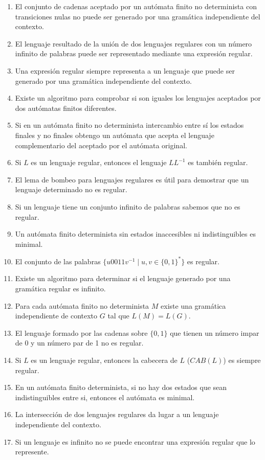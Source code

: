 \begin{enumerate}
    \item El conjunto de cadenas aceptado por un autómata finito no determinista con transiciones nulas no puede ser generado por una gramática independiente del contexto.
    \item El lenguaje resultado de la unión de dos lenguajes regulares con un número infinito de palabras puede ser representado mediante una expresión regular.
    \item Una expresión regular siempre representa a un lenguaje que puede ser generado por una gramática independiente del contexto.
    \item Existe un algoritmo para comprobar si son iguales los lenguajes aceptados por dos autómatas finitos diferentes.
    \item Si en un autómata finito no determinista intercambio entre sí los estados finales y no finales obtengo un autómata que acepta el lenguaje complementario del aceptado por el autómata original.
    \item Si $L$ es un lenguaje regular, entonces el lenguaje $LL^{-1}$ es también regular.
    \item El lema de bombeo para lenguajes regulares es útil para demostrar que un lenguaje determinado no es regular.
    \item Si un lenguaje tiene un conjunto infinito de palabras sabemos que no es regular.
    \item Un autómata finito determinista sin estados inaccesibles ni indistinguibles es minimal.
    \item El conjunto de las palabras $\{u0011v^{-1}\mid u,v\in {\{0,1\}}^{\ast}\}$ es regular.
    \item Existe un algoritmo para determinar si el lenguaje generado por una gramática regular es infinito.
    \item Para cada autómata finito no determinista $M$ existe una gramática independiente de contexto $G$ tal que $L(M) = L(G)$.
    \item El lenguaje formado por las cadenas sobre $\{0,1\}$ que tienen un número impar de 0 y un número par de 1 no es regular.
    \item Si $L$ es un lenguaje regular, entonces la cabecera de $L$ ($CAB(L)$) es siempre regular.
    \item En un autómata finito determinista, si no hay dos estados que sean indistinguibles entre si, entonces el autómata es minimal.
    \item La intersección de dos lenguajes regulares da lugar a un lenguaje independiente del contexto.
    \item Si un lenguaje es infinito no se puede encontrar una expresión regular que lo represente.
\end{enumerate}
